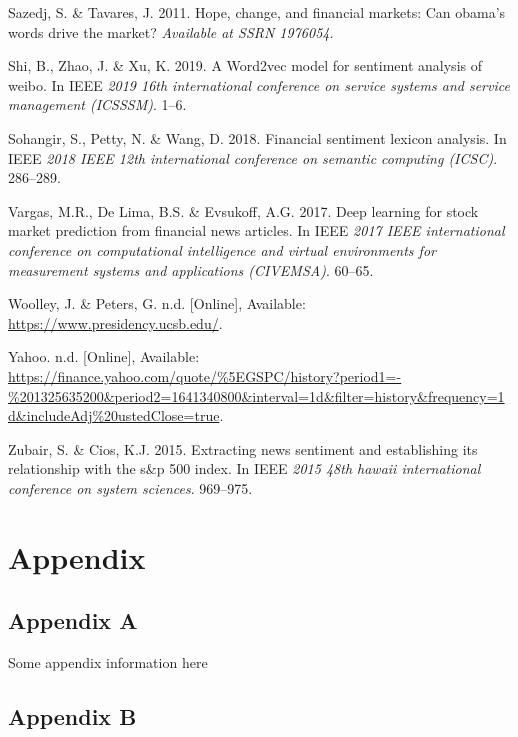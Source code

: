 \documentclass[11pt,preprint, authoryear]{elsarticle}
\numberwithin{equation}{section}
\numberwithin{figure}{section}
\numberwithin{table}{section}
\newlength{\cslhangindent}
\newenvironment{CSLReferences}%
  {\setlength{\parindent}{0pt}%
  \everypar{\setlength{\hangindent}{\cslhangindent}}\ignorespaces}%
  {\par}
\begin{document}
\begin{CSLReferences}{1}{0}
\leavevmode{}%
Sazedj, S. \& Tavares, J. 2011. Hope, change, and financial markets: Can
obama's words drive the market? \emph{Available at SSRN 1976054}.

\leavevmode{}%
Shi, B., Zhao, J. \& Xu, K. 2019. A Word2vec model for sentiment
analysis of weibo. In IEEE \emph{2019 16th international conference on
service systems and service management (ICSSSM)}. 1--6.

\leavevmode{}%
Sohangir, S., Petty, N. \& Wang, D. 2018. Financial sentiment lexicon
analysis. In IEEE \emph{2018 IEEE 12th international conference on
semantic computing (ICSC)}. 286--289.

\leavevmode{}%
Vargas, M.R., De Lima, B.S. \& Evsukoff, A.G. 2017. Deep learning for
stock market prediction from financial news articles. In IEEE \emph{2017
IEEE international conference on computational intelligence and virtual
environments for measurement systems and applications (CIVEMSA)}.
60--65.

\leavevmode{}%
Woolley, J. \& Peters, G. n.d. {[}Online{]}, Available:
\url{https://www.presidency.ucsb.edu/}.

\leavevmode{}%
Yahoo. n.d. {[}Online{]}, Available:
\url{https://finance.yahoo.com/quote/\%5EGSPC/history?period1=-\%201325635200\&period2=1641340800\&interval=1d\&filter=history\&frequency=1d\&includeAdj\%20ustedClose=true}.

\leavevmode{}%
Zubair, S. \& Cios, K.J. 2015. Extracting news sentiment and
establishing its relationship with the s\&p 500 index. In IEEE
\emph{2015 48th hawaii international conference on system sciences}.
969--975.

\end{CSLReferences}

\hypertarget{appendix}{%
\section*{Appendix}\label{appendix}}

\hypertarget{appendix-a}{%
\subsection*{Appendix A}\label{appendix-a}}

Some appendix information here

\hypertarget{appendix-b}{%
\subsection*{Appendix B}\label{appendix-b}}


\end{document}
